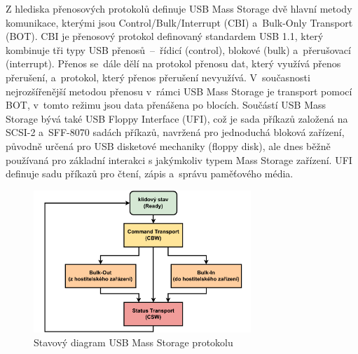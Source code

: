 Z hlediska přenosových protokolů definuje USB Mass Storage dvě hlavní metody komunikace, kterými jsou Control/Bulk/Interrupt (CBI) a~Bulk-Only Transport (BOT). CBI je přenosový protokol definovaný standardem USB 1.1, který kombinuje tři typy USB přenosů~--~řídicí (control), blokové (bulk) a~přerušovací (interrupt). Přenos se~dále dělí na protokol přenosu dat, který využívá přenos přerušení, a~protokol, který přenos přerušení nevyužívá. V~současnosti nejrozšířenější metodou přenosu v~rámci USB Mass Storage je transport pomocí BOT, v~tomto režimu jsou data přenášena po blocích.
Součástí USB Mass Storage bývá také USB Floppy Interface (UFI), což je sada příkazů založená na SCSI-2 a~SFF-8070 sadách příkazů, navržená pro jednoduchá bloková zařízení, původně určená pro USB disketové mechaniky (floppy disk), ale dnes běžně používaná pro základní interakci s jakýmkoliv typem Mass Storage zařízení. UFI definuje sadu příkazů pro čtení, zápis a~správu paměťového média.~\cite{usb_standard_ufi}

\begin{figure}[h]
    \centering
    \includegraphics[width=0.73\textwidth]{obrazky-figures/mass_storage_protocol-3.pdf}
    
    \caption{Stavový diagram USB Mass Storage protokolu~\cite{silicon_labs_mass_storage_protocol}}
    \label{fig:mass-storage-protocol}
\end{figure}

